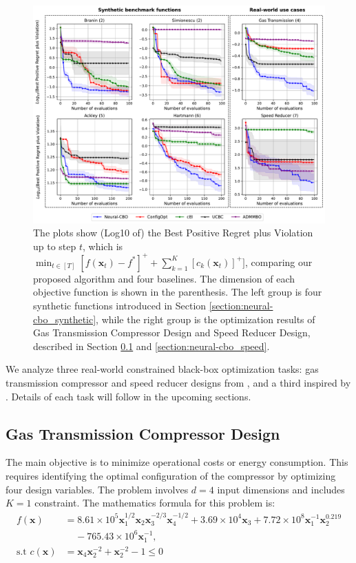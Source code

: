 \begin{figure}[h]
    \centering
   \includegraphics[width=\textwidth]{Figures/Neural-CBO/Branin-Simionescu-GasTransmission-Ackley-Hartmann-SpeedReducer.pdf}
    \caption{The plots show (Log10 of) the Best Positive Regret plus Violation up to step $t$, which is $\min_{t \in [T]} [f(\mathbf{x}_t) - f^*]^+ + \sum_{k=1}^K [c_k(\mathbf{x}_t)]^+ ]$, comparing our proposed algorithm and four baselines. The dimension of each objective function is shown in the parenthesis. The left group is four synthetic functions introduced in Section \ref{section:neural-cbo_synthetic}, while the right group is the optimization results of Gas Transmission Compressor Design and Speed Reducer Design, described in Section  \ref{section:neural-cbo_gas} and \ref{section:neural-cbo_speed}.}
    
    \label{fig:neural-cbo_synthetic}
\end{figure}

We analyze three real-world constrained black-box optimization tasks: gas transmission compressor and speed reducer designs from \citet{kumar2020test}, and a third inspired by \citet{he2018verideep}. Details of each task will follow in the upcoming sections.  
\subsection{Gas Transmission Compressor Design}
\label{section:neural-cbo_gas}
     The main objective is to minimize operational costs or energy consumption. This requires identifying the optimal configuration of the compressor by optimizing four design variables. The problem involves $d = 4$ input dimensions and includes $K = 1$ constraint. The mathematics formula for this problem is:
    \begin{align*}
        f(\mathbf{x}) & = 8.61 \times 10^5\mathbf{x}_1^{1/2} \mathbf{x}_2\mathbf{x}_3^{-2/3} \mathbf{x}_4^{-1/2}  + 3.69 \times 10^4\mathbf{x}_3 + 7.72 \times 10^8 \mathbf{x}_1^{-1} \mathbf{x}_2^{0.219} \\
        & \;\;\; \; - 765.43 \times 10^6\mathbf{x}_1^{-1},
        \\
        \text{s.t }  c(\mathbf{x}) &= \mathbf{x}_4\mathbf{x}_2^{-2} + \mathbf{x}_2^{-2} - 1 \le 0
    \end{align*}

